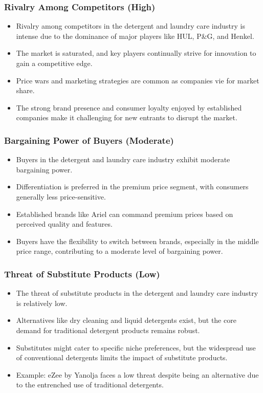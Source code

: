 \subsubsection{Rivalry Among Competitors (High)}
\begin{itemize}
  \item Rivalry among competitors in the detergent and laundry care industry is intense due to the dominance of major players like HUL, P\&G, and Henkel.
  \item The market is saturated, and key players continually strive for innovation to gain a competitive edge.
  \item Price wars and marketing strategies are common as companies vie for market share.
  \item The strong brand presence and consumer loyalty enjoyed by established companies make it challenging for new entrants to disrupt the market.
\end{itemize}

\subsubsection{Bargaining Power of Buyers (Moderate)}
\begin{itemize}
  \item Buyers in the detergent and laundry care industry exhibit moderate bargaining power.
  \item Differentiation is preferred in the premium price segment, with consumers generally less price-sensitive.
  \item Established brands like Ariel can command premium prices based on perceived quality and features.
  \item Buyers have the flexibility to switch between brands, especially in the middle price range, contributing to a moderate level of bargaining power.
\end{itemize}

\subsubsection{Threat of Substitute Products (Low)}
\begin{itemize}
  \item The threat of substitute products in the detergent and laundry care industry is relatively low.
  \item Alternatives like dry cleaning and liquid detergents exist, but the core demand for traditional detergent products remains robust.
  \item Substitutes might cater to specific niche preferences, but the widespread use of conventional detergents limits the impact of substitute products.
  \item Example: eZee by Yanolja faces a low threat despite being an alternative due to the entrenched use of traditional detergents.
\end{itemize}

